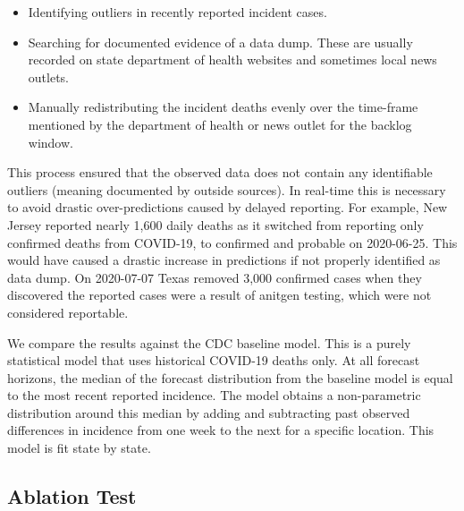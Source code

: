 \documentclass[11pt]{amsart}
\begin{document}
 \begin{itemize}
 \item Identifying outliers in recently reported incident cases.
 \item Searching for documented evidence of a data dump. These are usually recorded on state department of health websites and sometimes local news outlets.
 \item Manually redistributing the incident deaths evenly over the time-frame mentioned by the department of health or news outlet for the backlog window.
 \end{itemize}
 
 
 This process ensured that the observed data does not contain any identifiable outliers (meaning documented by outside sources). In real-time this is necessary to avoid drastic over-predictions caused by delayed reporting. For example, New Jersey reported nearly 1,600 daily deaths as it switched from reporting only confirmed deaths from COVID-19, to confirmed and probable on 2020-06-25. This would have caused a drastic increase in predictions if not properly identified as data dump. On 2020-07-07 Texas removed 3,000 confirmed cases when they discovered the reported cases were a result of anitgen testing, which were not considered reportable. 
 
 We compare the results against the CDC baseline model. This is a purely statistical model that uses historical COVID-19 deaths only. At all forecast horizons, the median of the forecast distribution from the baseline model is equal to the most recent reported incidence. The model obtains a non-parametric distribution around this median by adding and subtracting past observed differences in incidence from one week to the next for a specific location. This model is fit state by state. 
   
 
 \subsection{Ablation Test}
 
\end{document}
